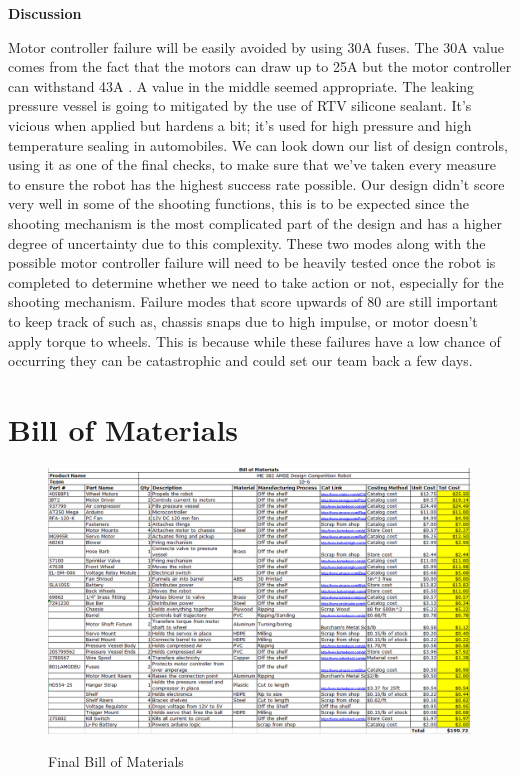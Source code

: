 \documentclass[12pt,letterpaper,titlepage]{article}
\begin{document}
\smallskip\noindent\textbf{Discussion}

Motor controller failure will be easily avoided by using 30A fuses. The 30A value comes from the fact that the motors can draw up to 25A \cite{car seat motor} but the motor controller can withstand 43A \cite{motor driver}. A value in the middle seemed appropriate. The leaking pressure vessel is going to mitigated by the use of RTV silicone sealant. It's vicious when applied but hardens a bit; it's used for high pressure and high temperature sealing in automobiles. We can look down our list of design controls, using it as one of the final checks, to make sure that we've taken every measure to ensure the robot has the highest success rate possible. Our design didn't score very well in some of the shooting functions, this is to be expected since the shooting mechanism is the most complicated part of the design and has a higher degree of uncertainty due to this complexity. These two modes along with the possible motor controller failure will need to be heavily tested once the robot is completed to determine whether we need to take action or not, especially for the shooting mechanism. Failure modes that score upwards of 80 are still important to keep track of such as, chassis snaps due to high impulse, or motor doesn't apply torque to wheels. This is because while these failures have a low chance of occurring they can be catastrophic and could set our team back a few days. 

\section{Bill of Materials}
\begin{figure}[H]
	\centering
	\includegraphics[width=\textwidth]{images/BOM}
	\label{fig:BOM}
	\caption{Final Bill of Materials}
\end{figure}
\end{document}
